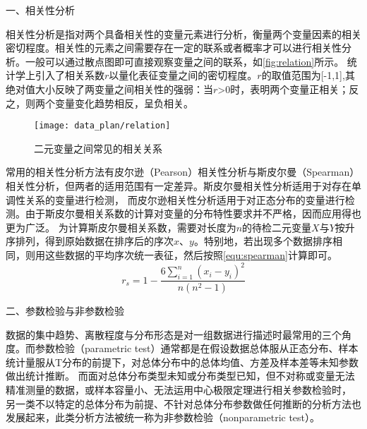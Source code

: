 一、相关性分析

相关性分析是指对两个具备相关性的变量元素进行分析，衡量两个变量因素的相关密切程度\cite{Zhang2019}。相关性的元素之间需要存在一定的联系或者概率才可以进行相关性分析。一般可以通过散点图即可直接观察变量之间的联系，如\autoref{fig:relation}所示。
统计学上引入了相关系数$r$以量化表征变量之间的密切程度。$r$的取值范围为[-1,1],其绝对值大小反映了两变量之间相关性的强弱：当$r$>0时，表明两个变量正相关；反之，则两个变量变化趋势相反，呈负相关。

\begin{figure}[htbp]
      \centering
      \texttt{[image: data\_plan/relation]}
      \caption[二元变量之间常见的相关关系]{\label{fig:relation}二元变量之间常见的相关关系\cite{IXL2022}}
\end{figure}

常用的相关性分析方法有皮尔逊（Pearson）相关性分析与斯皮尔曼（Spearman）相关性分析，但两者的适用范围有一定差异。斯皮尔曼相关性分析适用于对存在单调性关系的变量进行检测，
而皮尔逊相关性分析适用于对正态分布的变量进行检测。由于斯皮尔曼相关系数的计算对变量的分布特性要求并不严格，因而应用得也更为广泛。
为计算斯皮尔曼相关系数，需要对长度为$n$的待检二元变量$X$与$Y$按升序排列，得到原始数据在排序后的序次$x$、$y$。特别地，若出现多个数据排序相同，则用这些数据的平均序次统一表征，然后按照\autoref{equ:spearman}计算即可。
\begin{equation}
      \label{equ:spearman}
      r_{s}=1-\frac{6\sum_{i=1}^{n}(x_{i}-y_{i})^2}{n(n^2-1)}
\end{equation}

二、参数检验与非参数检验

数据的集中趋势、离散程度与分布形态是对一组数据进行描述时最常用的三个角度\cite{Hu2021}。而参数检验（parametric test）通常都是在假设数据总体服从正态分布、样本统计量服从T分布的前提下，对总体分布中的总体均值、方差及样本差等未知参数做出统计推断。
而面对总体分布类型未知或分布类型已知，但不对称或变量无法精准测量的数据，或样本容量小、无法运用中心极限定理进行相关参数检验时，
另一类不以特定的总体分布为前提、不针对总体分布参数做任何推断的分析方法也发展起来，此类分析方法被统一称为非参数检验（nonparametric test）\cite{Guo2017,Hu2021,Zhang2019}。

